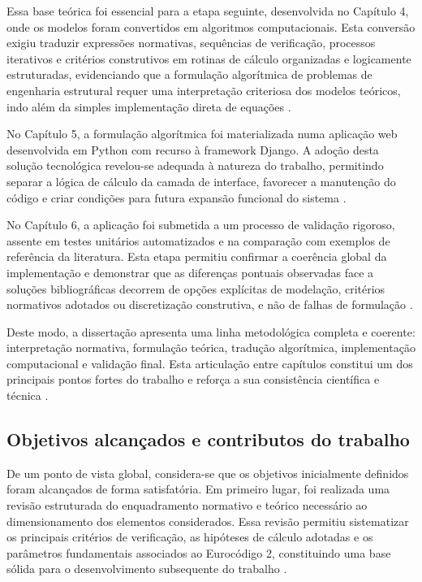 Essa base teórica foi essencial para a etapa seguinte, desenvolvida no Capítulo 4, onde os modelos foram convertidos em algoritmos computacionais. Esta conversão exigiu traduzir expressões normativas, sequências de verificação, processos iterativos e critérios construtivos em rotinas de cálculo organizadas e logicamente estruturadas, evidenciando que a formulação algorítmica de problemas de engenharia estrutural requer uma interpretação criteriosa dos modelos teóricos, indo além da simples implementação direta de equações \cite{EN1992,PythonDocs}.

No Capítulo 5, a formulação algorítmica foi materializada numa aplicação web desenvolvida em Python com recurso à framework Django. A adoção desta solução tecnológica revelou-se adequada à natureza do trabalho, permitindo separar a lógica de cálculo da camada de interface, favorecer a manutenção do código e criar condições para futura expansão funcional do sistema \cite{DjangoDocs,PythonDocs}.

No Capítulo 6, a aplicação foi submetida a um processo de validação rigoroso, assente em testes unitários automatizados e na comparação com exemplos de referência da literatura. Esta etapa permitiu confirmar a coerência global da implementação e demonstrar que as diferenças pontuais observadas face a soluções bibliográficas decorrem de opções explícitas de modelação, critérios normativos adotados ou discretização construtiva, e não de falhas de formulação \cite{Goodchild,Mosley,DjangoDocs}.

Deste modo, a dissertação apresenta uma linha metodológica completa e coerente: interpretação normativa, formulação teórica, tradução algorítmica, implementação computacional e validação final. Esta articulação entre capítulos constitui um dos principais pontos fortes do trabalho e reforça a sua consistência científica e técnica \cite{EN1992,Appleton,Goodchild,Mosley}.

\subsection{Objetivos alcançados e contributos do trabalho}

De um ponto de vista global, considera-se que os objetivos inicialmente definidos foram alcançados de forma satisfatória. Em primeiro lugar, foi realizada uma revisão estruturada do enquadramento normativo e teórico necessário ao dimensionamento dos elementos considerados. Essa revisão permitiu sistematizar os principais critérios de verificação, as hipóteses de cálculo adotadas e os parâmetros fundamentais associados ao Eurocódigo 2, constituindo uma base sólida para o desenvolvimento subsequente do trabalho \cite{EN1992,Appleton,CachimBases}.

